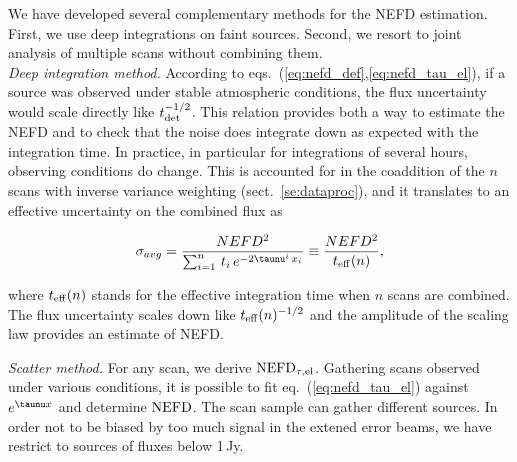 We have developed several complementary methods for the NEFD estimation. First,
we use deep integrations on faint sources. Second, we resort to joint
analysis of multiple scans without combining them.\\

\noindent \emph{Deep integration method.} According to
eqs.~(\ref{eq:nefd_def},\ref{eq:nefd_tau_el}), if a source was observed under
stable atmospheric conditions, the flux uncertainty would scale directly like
$t_{\rm{det}}^{-1/2}$. This relation provides both a way to estimate the NEFD and to
check that the noise does integrate down as expected with the integration
time. In practice, in particular for integrations of several hours, observing
conditions do change. This is accounted for in the coaddition of the $n$ scans with inverse
variance weighting (sect.~\ref{se:dataproc}), and it translates to an effective
uncertainty on the combined flux as

\begin{equation}
\sigma_{avg} = \frac{NEFD^2}{\sum_{i=1}^{n}\, t_i\,  e^{-2\taunu^i\, x_i}} \equiv
\frac{NEFD^2}{t_{\rm{eff}}(n)},
\label{eq:sigma_tau_w8}
\end{equation}

where $t_{\rm{eff}}(n)$ stands for the effective integration time when $n$ scans
are combined. The flux uncertainty scales down like $t_{\rm{eff}}(n)^{-1/2}$ and
the amplitude of the scaling law provides an estimate of NEFD.

\noindent \emph{Scatter method.} For any scan, we derive
$\rm{NEFD}_{\tau,el}$. Gathering scans observed under various conditions, it is
possible to fit eq.~(\ref{eq:nefd_tau_el}) against $e^{\taunu x}$ and determine
$\rm{NEFD}$. The scan sample can gather different sources. In order not to be
biased by too much signal in the extened error beams, we have restrict to
sources of fluxes below 1\,Jy.

